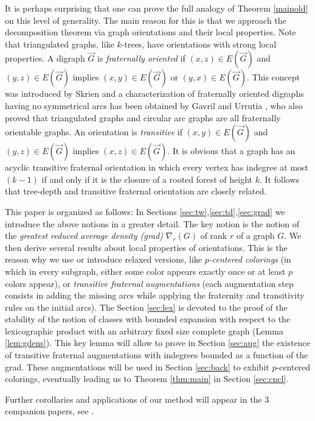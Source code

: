 \documentclass[a4paper]{amsart}
\theoremstyle{definition}
\theoremstyle{remark}
\newcommand{\rdens}[1]{\nabla_{#1}}
\def\vG{\vec{G}}
\begin{document}
It is perhaps surprising that one can prove the full analogy of Theorem \ref{mainold} 
on this level of generality.
The main reason for this is that we approach the decomposition theorem 
via graph orientations and their local properties. Note that 
triangulated graphs, like $k$-trees, have orientations with strong
local properties.
A digraph $\vG$ is {\em fraternally oriented} if $(x,z)\in E(\vG)$ and
$(y,z)\in E(\vG)$ implies $(x,y)\in E(\vG)$ or $(y,x)\in E(\vG)$. This
concept was introduced by Skrien \cite{skrien82} and a
characterization of fraternally oriented digraphs having no symmetrical
arcs has been obtained by Gavril and Urrutia \cite{gavril92}, who also proved that
triangulated graphs and circular arc graphs are all fraternally
orientable graphs. An orientation is {\em transitive} if $(x,y)\in
E(\vG)$ and $(y,z)\in E(\vG)$ implies $(x,z)\in E(\vG)$. It is obvious
that a graph  has an acyclic transitive
fraternal orientation in which every vertex has indegree at most
$(k-1)$ if and only if it is the closure of a rooted forest of height
$k$. It follows that tree-depth and transitive fraternal orientation
are closely related.

This paper is organized as follows: In Sections
 \ref{sec:tw},\ref{sec:td},\ref{sec:grad}
 we introduce the above notions in a greater detail.
The key notion is the notion of the {\em greatest reduced average density (grad)} $\rdens{r}(G)$
of rank $r$ of a graph $G$. We then derive several results about local properties of orientations.
 This is the
reason why we use or introduce relaxed versions, like {\em $p$-centered
colorings} (in which in every subgraph, either some color appears
exactly once or at least $p$ colors appear), or {\em transitive fraternal
augmentations} (each augmentation step consists in adding the missing
arcs while applying the fraternity and transitivity rules on the
initial arcs). 
The Section \ref{sec:lex} is devoted to the proof of the stability of the notion
of classes with bounded expansion with respect to the lexicographic
product with an arbitrary fixed size complete graph (Lemma
\ref{lem:gdens}). This key lemma will allow to prove in Section \ref{sec:aug} the
existence of transitive fraternal augmentations with indegrees bounded
as a function of the grad. These augmentations will be used in Section
\ref{sec:back} to exhibit $p$-centered colorings, eventually leading us to
Theorem \ref{thm:main} in Section \ref{sec:cncl}.

Further corollaries and applications of our method will appear in the
3 companion papers,  
see \cite{POMNII,POMNIII,POMNIV}.
\end{document}
